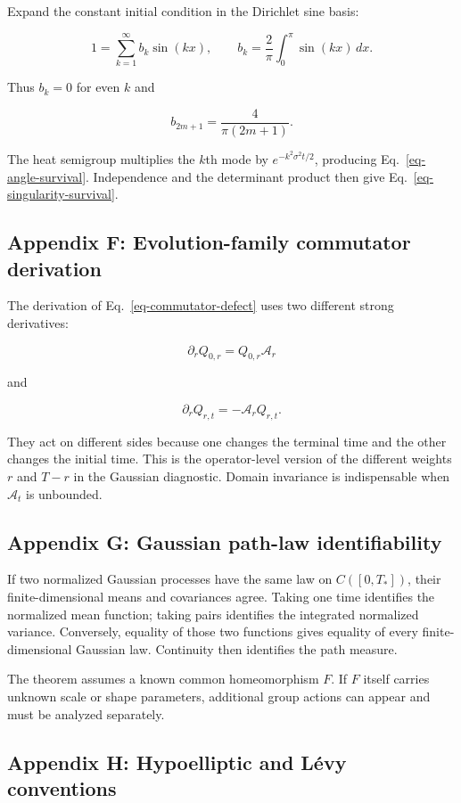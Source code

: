 \documentclass[
  english,
  11pt,
  letterpaper,
  DIV=11,
  numbers=noendperiod]{scrartcl}
\theoremstyle{plain}
\theoremstyle{plain}
\theoremstyle{plain}
\theoremstyle{plain}
\theoremstyle{remark}
\begin{document}
Expand the constant initial condition in the Dirichlet sine basis:

\[
1
=\sum_{k=1}^\infty b_k\sin(kx),
\qquad
b_k=\frac2\pi\int_0^\pi\sin(kx)\,dx.
\]

Thus \(b_k=0\) for even \(k\) and

\[
b_{2m+1}=\frac4{\pi(2m+1)}.
\]

The heat semigroup multiplies the \(k\)th mode by
\(e^{-k^2\sigma^2t/2}\), producing Eq.~\ref{eq-angle-survival}.
Independence and the determinant product then give
Eq.~\ref{eq-singularity-survival}.

\subsection{Appendix F: Evolution-family commutator
derivation}\label{sec-app-commutator}

The derivation of Eq.~\ref{eq-commutator-defect} uses two different
strong derivatives:

\[
\partial_rQ_{0,r}=Q_{0,r}\mathcal A_r
\]

and

\[
\partial_rQ_{r,t}=-\mathcal A_rQ_{r,t}.
\]

They act on different sides because one changes the terminal time and
the other changes the initial time. This is the operator-level version
of the different weights \(r\) and \(T-r\) in the Gaussian diagnostic.
Domain invariance is indispensable when \(\mathcal A_t\) is unbounded.

\subsection{Appendix G: Gaussian path-law
identifiability}\label{sec-app-scale}

If two normalized Gaussian processes have the same law on
\(C([0,T_*])\), their finite-dimensional means and covariances agree.
Taking one time identifies the normalized mean function; taking pairs
identifies the integrated normalized variance. Conversely, equality of
those two functions gives equality of every finite-dimensional Gaussian
law. Continuity then identifies the path measure.

The theorem assumes a known common homeomorphism \(F\). If \(F\) itself
carries unknown scale or shape parameters, additional group actions can
appear and must be analyzed separately.

\subsection{Appendix H: Hypoelliptic and Lévy
conventions}\label{sec-app-hypo-levy}
\end{document}
